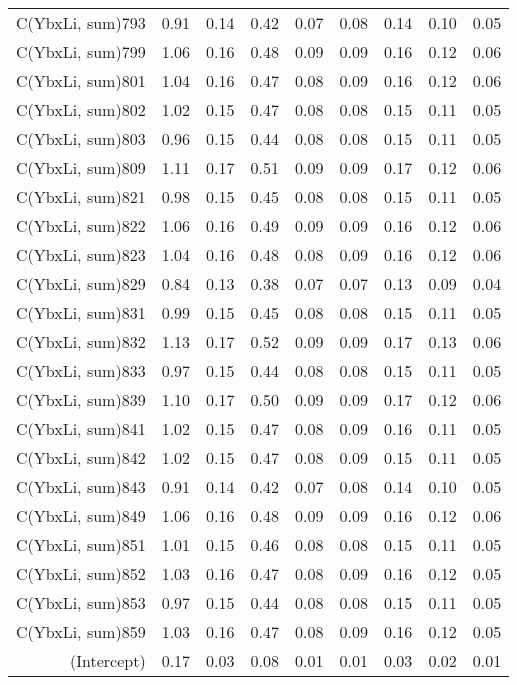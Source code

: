 \begin{table}[p]
\begin{tabular}{rrrrrrrrr}
  C(YbxLi, sum)793 & 0.91 & 0.14 & 0.42 & 0.07 & 0.08 & 0.14 & 0.10 & 0.05 \\ 
  C(YbxLi, sum)799 & 1.06 & 0.16 & 0.48 & 0.09 & 0.09 & 0.16 & 0.12 & 0.06 \\ 
  C(YbxLi, sum)801 & 1.04 & 0.16 & 0.47 & 0.08 & 0.09 & 0.16 & 0.12 & 0.06 \\ 
  C(YbxLi, sum)802 & 1.02 & 0.15 & 0.47 & 0.08 & 0.08 & 0.15 & 0.11 & 0.05 \\ 
  C(YbxLi, sum)803 & 0.96 & 0.15 & 0.44 & 0.08 & 0.08 & 0.15 & 0.11 & 0.05 \\ 
  C(YbxLi, sum)809 & 1.11 & 0.17 & 0.51 & 0.09 & 0.09 & 0.17 & 0.12 & 0.06 \\ 
  C(YbxLi, sum)821 & 0.98 & 0.15 & 0.45 & 0.08 & 0.08 & 0.15 & 0.11 & 0.05 \\ 
  C(YbxLi, sum)822 & 1.06 & 0.16 & 0.49 & 0.09 & 0.09 & 0.16 & 0.12 & 0.06 \\ 
  C(YbxLi, sum)823 & 1.04 & 0.16 & 0.48 & 0.08 & 0.09 & 0.16 & 0.12 & 0.06 \\ 
  C(YbxLi, sum)829 & 0.84 & 0.13 & 0.38 & 0.07 & 0.07 & 0.13 & 0.09 & 0.04 \\ 
  C(YbxLi, sum)831 & 0.99 & 0.15 & 0.45 & 0.08 & 0.08 & 0.15 & 0.11 & 0.05 \\ 
  C(YbxLi, sum)832 & 1.13 & 0.17 & 0.52 & 0.09 & 0.09 & 0.17 & 0.13 & 0.06 \\ 
  C(YbxLi, sum)833 & 0.97 & 0.15 & 0.44 & 0.08 & 0.08 & 0.15 & 0.11 & 0.05 \\ 
  C(YbxLi, sum)839 & 1.10 & 0.17 & 0.50 & 0.09 & 0.09 & 0.17 & 0.12 & 0.06 \\ 
  C(YbxLi, sum)841 & 1.02 & 0.15 & 0.47 & 0.08 & 0.09 & 0.16 & 0.11 & 0.05 \\ 
  C(YbxLi, sum)842 & 1.02 & 0.15 & 0.47 & 0.08 & 0.09 & 0.15 & 0.11 & 0.05 \\ 
  C(YbxLi, sum)843 & 0.91 & 0.14 & 0.42 & 0.07 & 0.08 & 0.14 & 0.10 & 0.05 \\ 
  C(YbxLi, sum)849 & 1.06 & 0.16 & 0.48 & 0.09 & 0.09 & 0.16 & 0.12 & 0.06 \\ 
  C(YbxLi, sum)851 & 1.01 & 0.15 & 0.46 & 0.08 & 0.08 & 0.15 & 0.11 & 0.05 \\ 
  C(YbxLi, sum)852 & 1.03 & 0.16 & 0.47 & 0.08 & 0.09 & 0.16 & 0.12 & 0.05 \\ 
  C(YbxLi, sum)853 & 0.97 & 0.15 & 0.44 & 0.08 & 0.08 & 0.15 & 0.11 & 0.05 \\ 
  C(YbxLi, sum)859 & 1.03 & 0.16 & 0.47 & 0.08 & 0.09 & 0.16 & 0.12 & 0.05 \\ 
  (Intercept) & 0.17 & 0.03 & 0.08 & 0.01 & 0.01 & 0.03 & 0.02 & 0.01 \\ 
   \hline
\end{tabular}
\end{table}
